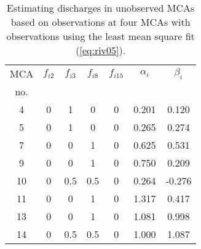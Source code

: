 \begin{table}[t]
 \caption{Estimating discharges in unobserved MCAs based on observations
 at four MCAs with observations using the least mean square fit (\ref{eq:riv05}).}
 \label{tab:rivers04}       %
 \centering
   \begin{tabular}{ccccccc}
   \hline
   MCA & $f_{i2}$ & $f_{i3}$ & $f_{i8}$ & $f_{i15}$ & $\alpha_i$ & $\beta_i$  \\
   no. &          &          &          &           &            &            \\ 
   \hline
   4   & 0        &  1       &  0       &  0        & 0.201      &  0.120     \\
   5   & 0        &  1       &  0       &  0        & 0.265      &  0.274     \\
   7   & 0        &  0       &  1       &  0        & 0.625      &  0.531     \\
   9   & 0        &  0       &  1       &  0        & 0.750      &  0.209     \\
   10  & 0        &  0.5     &  0.5     &  0        & 0.264      & -0.276     \\
   11  & 0        &  0       &  1       &  0        & 1.317      &  0.417     \\
   13  & 0        &  0       &  1       &  0        & 1.081      &  0.998     \\
   14  & 0        &  0.5     &  0.5     &  0        & 1.000      &  1.087     \\
   \hline
   \end{tabular}
\end{table}


